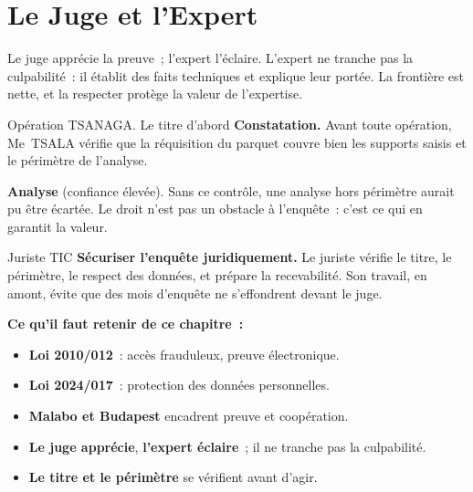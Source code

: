 \section{Le Juge et l'Expert}
\label{sec:c04-juge}

Le juge apprécie la preuve~; l'expert l'éclaire. L'expert ne tranche pas la
culpabilité~: il établit des faits techniques et explique leur portée. La
frontière est nette, et la respecter protège la valeur de l'expertise.

\begin{boxscenario}{Opération TSANAGA. Le titre d'abord}
\textbf{Constatation.} Avant toute opération, Me~TSALA vérifie que la
réquisition du parquet couvre bien les supports saisis et le périmètre de
l'analyse.

\medskip
\textbf{Analyse} (confiance élevée). Sans ce contrôle, une analyse hors
périmètre aurait pu être écartée. Le droit n'est pas un obstacle à l'enquête~:
c'est ce qui en garantit la valeur.
\end{boxscenario}

\begin{boxmetier}{Juriste TIC}
\textbf{Sécuriser l'enquête juridiquement.} Le juriste vérifie le titre, le
périmètre, le respect des données, et prépare la recevabilité. Son travail,
en amont, évite que des mois d'enquête ne s'effondrent devant le juge.
\end{boxmetier}

\separateur

\begin{boxresume}
\textbf{Ce qu'il faut retenir de ce chapitre~:}
\begin{itemize}
    \item \textbf{Loi 2010/012}~: accès frauduleux, preuve électronique.
    \item \textbf{Loi 2024/017}~: protection des données personnelles.
    \item \textbf{Malabo et Budapest} encadrent preuve et coopération.
    \item \textbf{Le juge apprécie}, \textbf{l'expert éclaire}~; il ne tranche
          pas la culpabilité.
    \item \textbf{Le titre et le périmètre} se vérifient avant d'agir.
\end{itemize}
\end{boxresume}

